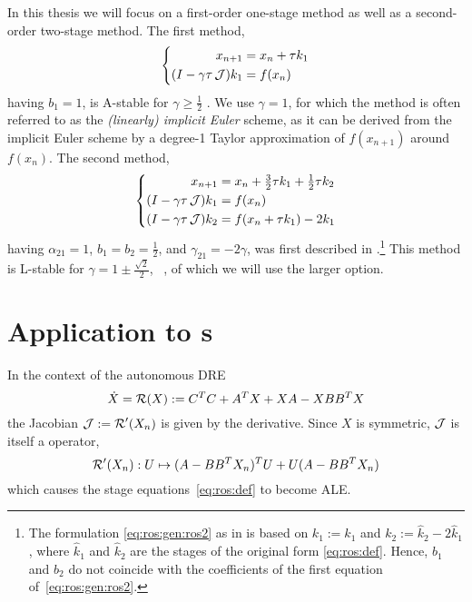 In this thesis we will focus on a first-order one-stage method as well as a second-order two-stage method.
The first method, 
\begin{equation}
\label{eq:ros:gen:ros1}
\left\{
\begin{aligned}
  x_{n+1} &= x_n + \tau k_1 \\
  (I - \gamma\tau \operatorname{\mathcal J}) k_1 &= f(x_n)
\end{aligned}
\right.
\end{equation}
having $b_1=1$,
is A-stable for $\gamma \geq \frac{1}{2}$ \cite[Table~6.3]{HairerWanner2}.
We use $\gamma=1$, for which the method
is often referred to as the \emph{(linearly) implicit Euler} scheme,
as it can be derived from the implicit Euler scheme
by a degree-1 Taylor approximation of $f(x_{n+1})$ around $f(x_n)$.
The second method, 
\begin{equation}
\label{eq:ros:gen:ros2}
\left\{
\begin{aligned}
  x_{n+1} &= x_n + \tfrac{3}{2} \tau k_1 + \tfrac{1}{2} \tau k_2 \\
  (I - \gamma\tau \operatorname{\mathcal J}) k_1 &= f(x_n) \\
  (I - \gamma\tau \operatorname{\mathcal J}) k_2 &= f(x_n + \tau k_1) - 2k_1
\end{aligned}
\right.
\end{equation}
having $\alpha_{21}=1$, $b_1=b_2=\frac{1}{2}$, and $\gamma_{21}=-2\gamma$,
was first described in \cite{Verwer1999}.\footnote{%
  The formulation \eqref{eq:ros:gen:ros2} as in \cite[Equation~(3.4)]{Verwer1999}
  is based on $k_1 := \hat k_1$ and $k_2 := \hat k_2 - 2 \hat k_1$,
  where $\hat k_1$ and $\hat k_2$ are the stages of the original form \eqref{eq:ros:def}.
  Hence, $b_1$ and $b_2$ do not coincide with the coefficients of the first equation of~\eqref{eq:ros:gen:ros2}.
}
This method is L-stable for $\gamma = 1 \pm \frac{\sqrt{2}}{2}$,
\cf~\cite[Table~6.4]{HairerWanner2},
of which we will use the larger option.

\section{Application to \texorpdfstring{s}{DREs}}

In the context of the autonomous \ac{DRE}
\begin{equation}
\label{eq:ros:DRE}
  \dot X = \operatorname{\mathcal R}(X) :=
  C^T C + A^T X + XA - X BB^T X
\end{equation}
the Jacobian $\operatorname{\mathcal J} := \operatorname{\mathcal R}'(X_n)$ is given by the \Frechet derivative.
Since $X$ is symmetric,
$\operatorname{\mathcal J}$ is itself a \Lyapunov operator,
\begin{equation}
  \operatorname{\mathcal R}'(X_n) : U \mapsto (A - BB^T X_n)^T U + U (A - BB^T X_n)
\end{equation}
which causes the stage equations~\eqref{eq:ros:def} to become \ac{ALE}.

